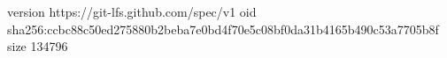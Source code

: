 version https://git-lfs.github.com/spec/v1
oid sha256:ccbc88c50ed275880b2beba7e0bd4f70e5c08bf0da31b4165b490c53a7705b8f
size 134796

